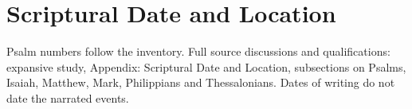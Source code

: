 \clearpage
\section{Scriptural Date and Location}


{\footnotesize Psalm numbers follow the inventory. Full source discussions and qualifications: expansive study, Appendix: Scriptural Date and Location, subsections on Psalms, Isaiah, Matthew, Mark, Philippians and Thessalonians. Dates of writing do not date the narrated events.\par}
